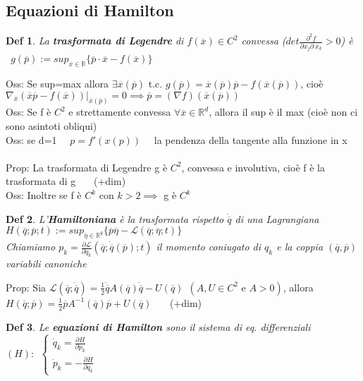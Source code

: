 \documentclass{article}
\theoremstyle{unnumbered}
\newtheorem* {theoremT}{Def}
\theoremstyle{unnumbered1}
\newenvironment{defi}{\begin{gBox}\begin{theoremT}}{\end{theoremT}\end{gBox}}
\begin{document}
\subsection{Equazioni di Hamilton}
%
\begin{defi}
La \textbf{trasformata di Legendre} di $f(\overline{x})\in C^2$ convessa ($det\frac{\partial^2f}{\partial x_j\partial\ x_k}>0$) è \ $g(\overline{p}):=sup_{\overline{x}\in\mathbb{R}} \{\overline{p}\cdot\overline{x}-f(\overline{x})\} $
\end{defi}
%
Oss: Se sup=max allora $\exists \overline{x}(\overline{p})$ t.c. $g(\overline{p})=\overline{x}(\overline{p})\overline{p} -f(\overline{x}(\overline{p}))$, cioè $\nabla_{\overline{x}}(\overline{x}\overline{p} -f(\overline{x}))|_{\overline{x}(\overline{p})}=0 \implies \overline{p}=(\nabla f)(\overline{x}(\overline{p}))$ \\
%
Oss: Se f è $C^2$ e strettamente convessa $\forall \overline{x}\in\mathbb{R}^d$, allora il sup è il max (cioè non ci sono asintoti obliqui)\\
Oss: se d=1 \ \ $p=f'(x(p))$ \ \ la pendenza della tangente alla funzione in x\\ \\
%
%
%
Prop: La trasformata di Legendre g è $C^2$, convessa e involutiva, cioè f è la trasformata di g \ \ \ (+dim)\\
Oss: Inoltre se f è $C^k$ con $k>2 \implies$ g è $C^k$\\
%
%
%
\begin{defi}
L'\textbf{Hamiltoniana} è la trasformata rispetto $\dot{\overline{q}}$ di una Lagrangiana $H(\overline{q};\overline{p};t):=sup_{\overline{\eta}\in\mathbb{R}^g}\{\overline{p}\overline{\eta}-\mathcal{L}(\overline{q};\overline{\eta};t) \}$\\
Chiamiamo $p_k=\frac{\partial\mathcal{L}}{\partial\dot{q}_k}(\overline{q};\dot{\overline{q}}(\overline{p});t)$ il momento coniugato di $q_k$ e la coppia $(\overline{q},\overline{p})$ variabili canoniche
\end{defi}
%
%
%
Prop: Sia $\mathcal{L}(\overline{q};\dot{\overline{q}})=\frac{1}{2}\dot{\overline{q}}A(\overline{q})\dot{\overline{q}}-U(\overline{q}) \ \ (A,U\in C^2 \text{ e } A>0)$, allora $H(\overline{q};\overline{p})=\frac{1}{2}\overline{p}A^{-1}(\overline{q})\overline{p}+U(\overline{q})$ \ \ \ (+dim)\\
%
%
%
\begin{defi}
Le \textbf{equazioni di Hamilton} sono il sistema di eq.\! differenziali $(H): \ \ \begin{cases}
    \dot{q}_k=\frac{\partial H}{\partial p_k}\\
    \dot{p}_k=-\frac{\partial H}{\partial q_k}
\end{cases}$
\end{defi}
\end{document}
